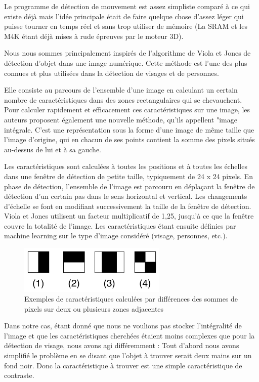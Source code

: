 \documentclass[10pt,a4paper]{report}
\begin{document}
Le programme de détection de mouvement est assez simpliste comparé à ce qui existe déjà mais l'idée principale était de faire quelque chose d'assez léger qui puisse tourner en temps réel et sans trop utiliser de mémoire (La SRAM et les M4K étant déjà mises à rude épreuves par le moteur 3D). 

Nous nous sommes principalement inspirés de l'algorithme de Viola et Jones de détection d'objet dans une image numérique. Cette méthode est l'une des plus connues et plus utilisées dans la détection de visages et de personnes. 

Elle consiste au parcours de l'ensemble d'une image en calculant un certain nombre de caractéristiques dans des zones rectangulaires qui se chevauchent. Pour calculer rapidement et efficacement ces caractéristiques sur une image, les auteurs proposent également une nouvelle méthode, qu'ils appellent "image intégrale. C'est une représentation sous la forme d'une image de même taille que l'image d'origine, qui en chacun de ses points contient la somme des pixels situés au-dessus de lui et à sa gauche.


Les caractéristiques sont calculées à toutes les positions et à toutes les échelles dans une fenêtre de détection de petite taille, typiquement de 24 x 24 pixels. En phase de détection, l'ensemble de l'image est parcouru en déplaçant la fenêtre de détection d'un certain pas dans le sens horizontal et vertical. Les changements d'échelle se font en modifiant successivement la taille de la fenêtre de détection. Viola et Jones utilisent un facteur multiplicatif de 1,25, jusqu'à ce que la fenêtre couvre la totalité de l'image. Les caractéristiques étant ensuite définies par machine learning sur le type d'image considéré (visage, personnes, etc.).

\begin{figure}
\centering
\includegraphics[width=200pt]{gfx/caract_VJ.png}
\caption{Exemples de caractéristiques calculées par différences des sommes de pixels sur deux ou plusieurs zones adjacentes}
\label{VJ}
\end{figure}

Dans notre cas, étant donné que nous ne voulions pas stocker l'intégralité de l'image et que les caractéristiques cherchées étaient moins complexes que pour la détection de visage, nous avons agi différemment : Tout d'abord nous avons simplifié le problème en se disant que l'objet à trouver serait deux mains sur un fond noir. Donc la caractéristique à trouver est une simple caractéristique de contraste. 
\end{document}
